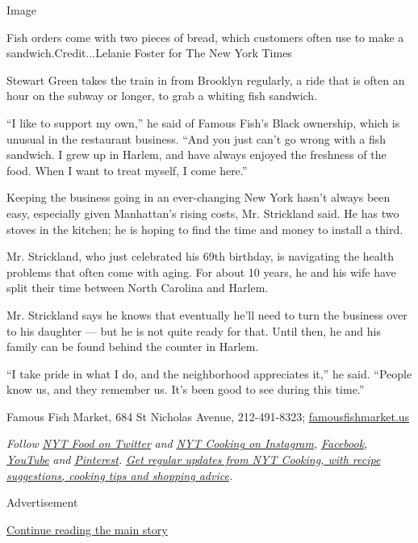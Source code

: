 Image

Fish orders come with two pieces of bread, which customers often use to
make a sandwich.Credit...Lelanie Foster for The New York Times

Stewart Green takes the train in from Brooklyn regularly, a ride that is
often an hour on the subway or longer, to grab a whiting fish sandwich.

``I like to support my own,'' he said of Famous Fish's Black ownership,
which is unusual in the restaurant business. ``And you just can't go
wrong with a fish sandwich. I grew up in Harlem, and have always enjoyed
the freshness of the food. When I want to treat myself, I come here.''

Keeping the business going in an ever-changing New York hasn't always
been easy, especially given Manhattan's rising costs, Mr. Strickland
said. He has two stoves in the kitchen; he is hoping to find the time
and money to install a third.

Mr. Strickland, who just celebrated his 69th birthday, is navigating the
health problems that often come with aging. For about 10 years, he and
his wife have split their time between North Carolina and Harlem.

Mr. Strickland says he knows that eventually he'll need to turn the
business over to his daughter --- but he is not quite ready for that.
Until then, he and his family can be found behind the counter in Harlem.

``I take pride in what I do, and the neighborhood appreciates it,'' he
said. ``People know us, and they remember us. It's been good to see
during this time.''

Famous Fish Market, 684 St Nicholas Avenue, 212-491-8323;
\href{http://www.famousfishmarket.us/}{famousfishmarket.us}

\emph{Follow} \href{https://twitter.com/nytfood}{\emph{NYT Food on
Twitter}} \emph{and}
\href{https://www.instagram.com/nytcooking/}{\emph{NYT Cooking on
Instagram}}\emph{,}
\href{https://www.facebook.com/nytcooking/}{\emph{Facebook}}\emph{,}
\href{https://www.youtube.com/nytcooking}{\emph{YouTube}} \emph{and}
\href{https://www.pinterest.com/nytcooking/}{\emph{Pinterest}}\emph{.}
\href{https://www.nytimes.com/newsletters/cooking}{\emph{Get regular
updates from NYT Cooking, with recipe suggestions, cooking tips and
shopping advice}}\emph{.}

Advertisement

\protect\hyperlink{after-bottom}{Continue reading the main story}

